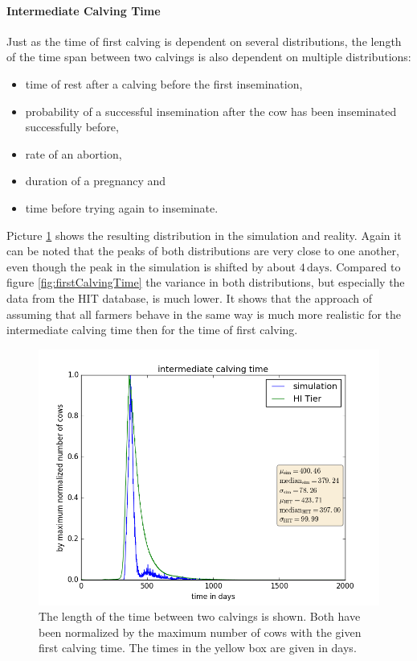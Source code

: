 \paragraph{Intermediate Calving Time}
Just as the time of first calving is dependent on several distributions, the length of the time span between two calvings is also dependent on multiple distributions:
\begin{itemize}
\item time of rest after a calving before the first insemination,
\item probability of a successful insemination after the cow has been inseminated successfully before,
\item rate of an abortion,
\item duration of a pregnancy and
\item time before trying again to inseminate.
\end{itemize}
Picture \ref{fig:intermediateCalvingTime} shows the resulting distribution in the simulation and reality. Again it can be noted that the peaks of both distributions are very close to one another, even though the peak in the simulation is shifted by about $4\,\text{days}$. Compared to figure \ref{fig:firstCalvingTime} the variance in both distributions, but especially the data from the HIT database, is much lower. It shows that the approach of assuming that all farmers behave in the same way is much more realistic for the intermediate calving time then for the time of first calving.
\begin{figure}[htbp]
\centering
\noindent\includegraphics[width=0.8\linewidth,height=\textheight,
keepaspectratio]{intermediateCalvingTimeswithCSV.png} 
\caption[Intermediate Calving Times]{The length of the time between two calvings is shown. Both have been normalized by the maximum number of cows with the given first calving time. The times in the yellow box are given in days.}
\label{fig:intermediateCalvingTime}
\end{figure}
